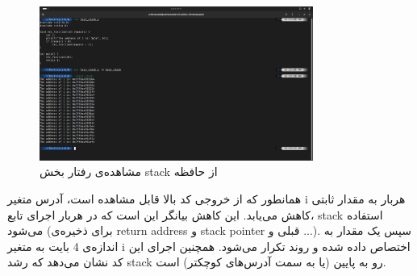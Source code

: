 \documentclass[12pt]{article}
\begin{document}
\begin{itemize}
        \begin{figure}[H]
		\centering
		\includegraphics[width=0.8\textwidth]{report6-resources/13.png}
		\caption{مشاهده‌ی رفتار بخش ‌\textenglish{stack} از حافظه}
            \label{im13}
	\end{figure}

        همانطور که از خروجی کد بالا قابل مشاهده است، آدرس متغیر
        \textenglish{i}
        هربار به مقدار ثابتی کاهش می‌یابد. این کاهش بیانگر این است که در هربار اجرای تابع، 
        \textenglish{stack}
        استفاده می‌شود (برای ذخیره‌ی 
        \textenglish{return address}
        و
        \textenglish{stack pointer}
        قبلی و ...). سپس یک مقدار به اندازه‌ی 
        \textenglish{4}
        بایت به متغیر
        \textenglish{i}
        اختصاص داده شده و روند تکرار می‌شود. همچنین اجرای این کد نشان می‌دهد که رشد 
        \textenglish{stack}
        رو به پایین (یا به سمت آدرس‌های کوچکتر) است.
        
        \end{itemize}
    
	
	\newpage
	\begin{LTR}
		\begin{english}
\printbibliography[title={مراجع}]
\end{english}
	\end{LTR}

	
\end{document}

